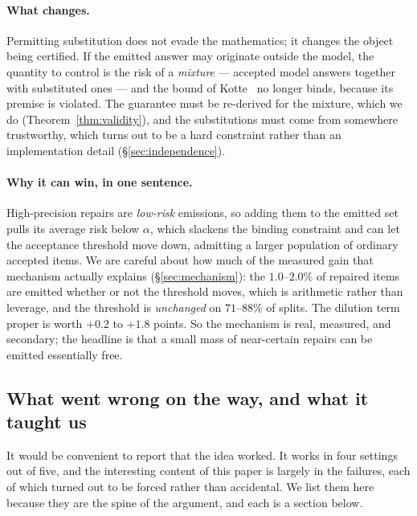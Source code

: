 \documentclass[review,number,doubleblind]{elsarticle}
\theoremstyle{plain}
\theoremstyle{definition}
\theoremstyle{remark}
\begin{document}
\paragraph{What changes.}
Permitting substitution does not evade the mathematics; it changes the object being
certified. If the emitted answer may originate outside the model, the quantity to control
is the risk of a \emph{mixture} --- accepted model answers together with substituted ones
--- and the bound of Kotte~\cite{crcimposs} no longer binds, because its premise is violated.
The guarantee must be re-derived for the mixture, which we do
(Theorem~\ref{thm:validity}), and the substitutions must come from somewhere trustworthy,
which turns out to be a hard constraint rather than an implementation detail
(\S\ref{sec:independence}).

\paragraph{Why it can win, in one sentence.}
High-precision repairs are \emph{low-risk} emissions, so adding them to the emitted set
pulls its average risk below $\alpha$, which slackens the binding constraint and can let the
acceptance threshold move down, admitting a larger population of ordinary accepted items. We
are careful about how much of the measured gain that mechanism actually explains
(\S\ref{sec:mechanism}): the $1.0$--$2.0\%$ of repaired items are emitted whether or not the
threshold moves, which is arithmetic rather than leverage, and the threshold is
\emph{unchanged} on $71$--$88\%$ of splits. The dilution term proper is worth $+0.2$ to
$+1.8$ points. So the mechanism is real, measured, and secondary; the headline is that a
small mass of near-certain repairs can be emitted essentially free.

\subsection{What went wrong on the way, and what it taught us}

It would be convenient to report that the idea worked. It works in four settings out of
five, and the interesting content of this paper is largely in the failures, each of which
turned out to be forced rather than accidental. We list them here because they are the
spine of the argument, and each is a section below.
\end{document}
